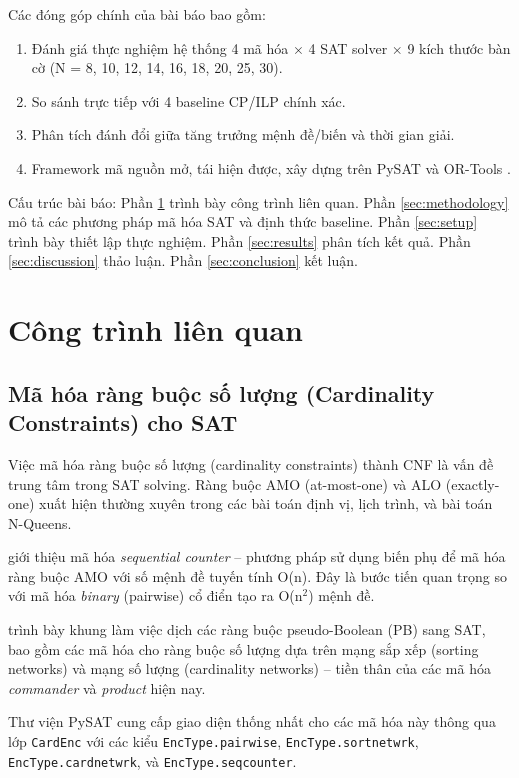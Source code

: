 \documentclass[a4paper,fleqn]{cas-sc}
\begin{document}
Các đóng góp chính của bài báo bao gồm:
\begin{enumerate}
    \item Đánh giá thực nghiệm hệ thống 4 mã hóa $\times$ 4 SAT solver $\times$ 9 kích thước bàn cờ (N = 8, 10, 12, 14, 16, 18, 20, 25, 30).
    \item So sánh trực tiếp với 4 baseline CP/ILP chính xác.
    \item Phân tích đánh đổi giữa tăng trưởng mệnh đề/biến và thời gian giải.
    \item Framework mã nguồn mở, tái hiện được, xây dựng trên PySAT \citep{iglesias2014pysat} và OR-Tools \citep{ortools2024}.
\end{enumerate}

Cấu trúc bài báo: Phần \ref{sec:related} trình bày công trình liên quan. Phần \ref{sec:methodology} mô tả các phương pháp mã hóa SAT và định thức baseline. Phần \ref{sec:setup} trình bày thiết lập thực nghiệm. Phần \ref{sec:results} phân tích kết quả. Phần \ref{sec:discussion} thảo luận. Phần \ref{sec:conclusion} kết luận.

\section{Công trình liên quan}
\label{sec:related}

\subsection{Mã hóa ràng buộc số lượng (Cardinality Constraints) cho SAT}
Việc mã hóa ràng buộc số lượng (cardinality constraints) thành CNF là vấn đề trung tâm trong SAT solving. Ràng buộc AMO (at-most-one) và ALO (exactly-one) xuất hiện thường xuyên trong các bài toán định vị, lịch trình, và bài toán N-Queens.

\citet{sinz2005towards} giới thiệu mã hóa \textit{sequential counter} -- phương pháp sử dụng biến phụ để mã hóa ràng buộc AMO với số mệnh đề tuyến tính O(n). Đây là bước tiến quan trọng so với mã hóa \textit{binary} (pairwise) cổ điển tạo ra O(n$^2$) mệnh đề.

\citet{een2005translating} trình bày khung làm việc dịch các ràng buộc pseudo-Boolean (PB) sang SAT, bao gồm các mã hóa cho ràng buộc số lượng dựa trên mạng sắp xếp (sorting networks) và mạng số lượng (cardinality networks) -- tiền thân của các mã hóa \textit{commander} và \textit{product} hiện nay.

Thư viện PySAT \citep{iglesias2014pysat, pysat2024} cung cấp giao diện thống nhất cho các mã hóa này thông qua lớp \texttt{CardEnc} với các kiểu \texttt{EncType.pairwise}, \texttt{EncType.sortnetwrk}, \texttt{EncType.cardnetwrk}, và \texttt{EncType.seqcounter}.
\end{document}
